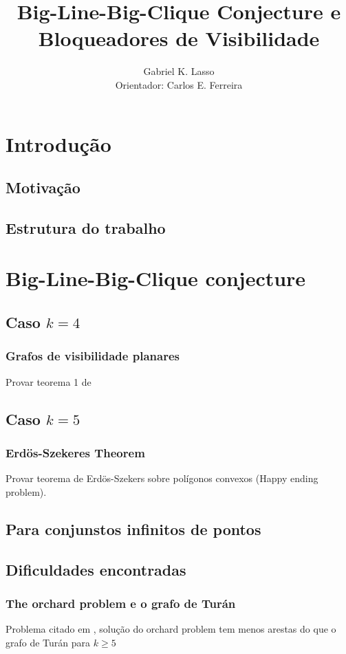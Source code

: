 \documentclass[a4paper]{book}
\title{\textbf{Big-Line-Big-Clique Conjecture e Bloqueadores de Visibilidade}}
\author{Gabriel K. Lasso\\ Orientador: Carlos E. Ferreira}
\date{}
\begin{document}
\maketitle
\tableofcontents
\chapter{Introdução}

\section{Motivação}

\section{Estrutura do trabalho}

\chapter{Big-Line-Big-Clique conjecture}

\section{Caso $k=4$}
\subsection{Grafos de visibilidade planares}
Provar teorema 1 de \cite{planar}
\cite{visibilitygraph}
\section{Caso $k=5$}
\subsection{Erdös-Szekeres Theorem}
Provar teorema de Erdös-Szekers sobre polígonos convexos (Happy ending problem).
\cite{pentagon}
\section{Para conjunstos infinitos de pontos}
\cite{infinity}
\section{Dificuldades encontradas}
\subsection{The orchard problem e o grafo de Turán}
Problema citado em \cite{visblock}, solução do orchard problem tem menos arestas do que o grafo de Turán para $k\geq 5$
\end{document}
